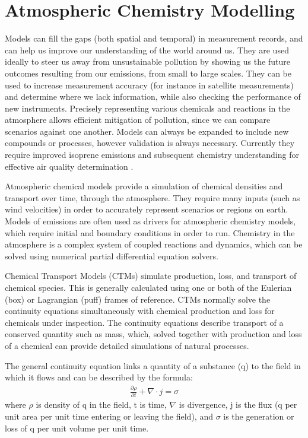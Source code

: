   
\section{Atmospheric Chemistry Modelling}
\label{LR:Models}
  
  Models can fill the gaps (both spatial and temporal) in measurement records, and can help us improve our understanding of the world around us.
  They are used ideally to steer us away from unsustainable pollution by showing us the future outcomes resulting from our emissions, from small to large scales.
  They can be used to increase measurement accuracy (for instance in satellite measurements) and determine where we lack information, while also checking the performance of new instruments.
  Precisely representing various chemicals and reactions in the atmosphere allows efficient mitigation of pollution, since we can compare scenarios against one another.
  Models can always be expanded to include new compounds or processes, however validation is always necessary.
  Currently they require improved isoprene emissions and subsequent chemistry understanding for effective air quality determination \parencite{Marvin2017}.
  
  Atmospheric chemical models provide a simulation of chemical densities and transport over time, through the atmosphere.
  They require many inputs (such as wind velocities) in order to accurately represent scenarios or regions on earth.
  Models of emissions are often used as drivers for atmospheric chemistry models, which require initial and boundary conditions in order to run.
  Chemistry in the atmosphere is a complex system of coupled reactions and dynamics, which can be solved using numerical partial differential equation solvers.
  
  Chemical Transport Models (CTMs) simulate production, loss, and transport of chemical species.
  This is generally calculated using one or both of the Eulerian (box) or Lagrangian (puff) frames of reference.
  CTMs normally solve the continuity equations simultaneously with chemical production and loss for chemicals under inspection.
  The continuity equations describe transport of a conserved quantity such as mass, which, solved together with production and loss of a chemical can provide detailed simulations of natural processes.
  
  The general continuity equation links a quantity of a substance (q) to the field in which it flows and can be described by the formula:
  \begin{align*}
    \frac{\partial \rho}{\partial t} + \nabla \cdot j = \sigma 
  \end{align*}
  where $\rho$ is density of q in the field, t is time, $\nabla$ is divergence, j is the flux (q per unit area per unit time entering or leaving the field), and $\sigma$ is the generation or loss of q per unit volume per unit time.
  
